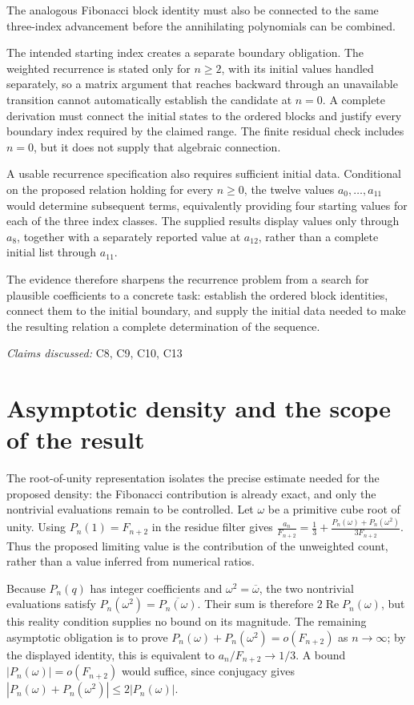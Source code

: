 \documentclass[11pt]{article}
\begin{document}
The analogous Fibonacci block identity must also be connected to the same three-index advancement before the annihilating polynomials can be combined.

The intended starting index creates a separate boundary obligation. The weighted recurrence is stated only for $n\geq2$, with its initial values handled separately, so a matrix argument that reaches backward through an unavailable transition cannot automatically establish the candidate at $n=0$. A complete derivation must connect the initial states to the ordered blocks and justify every boundary index required by the claimed range. The finite residual check includes $n=0$, but it does not supply that algebraic connection.

A usable recurrence specification also requires sufficient initial data. Conditional on the proposed relation holding for every $n\geq0$, the twelve values $a_0,\ldots,a_{11}$ would determine subsequent terms, equivalently providing four starting values for each of the three index classes. The supplied results display values only through $a_8$, together with a separately reported value at $a_{12}$, rather than a complete initial list through $a_{11}$.

The evidence therefore sharpens the recurrence problem from a search for plausible coefficients to a concrete task: establish the ordered block identities, connect them to the initial boundary, and supply the initial data needed to make the resulting relation a complete determination of the sequence.

\textit{Claims discussed: }C8, C9, C10, C13
\section{Asymptotic density and the scope of the result}
The root-of-unity representation isolates the precise estimate needed for the proposed density: the Fibonacci contribution is already exact, and only the nontrivial evaluations remain to be controlled. Let $\omega$ be a primitive cube root of unity. Using $P_n(1)=F_{n+2}$ in the residue filter gives $\frac{a_n}{F_{n+2}}=\frac13+\frac{P_n(\omega)+P_n(\omega^2)}{3F_{n+2}}$. Thus the proposed limiting value is the contribution of the unweighted count, rather than a value inferred from numerical ratios.

Because $P_n(q)$ has integer coefficients and $\omega^2=\overline{\omega}$, the two nontrivial evaluations satisfy $P_n(\omega^2)=\overline{P_n(\omega)}$. Their sum is therefore $2\operatorname{Re}P_n(\omega)$, but this reality condition supplies no bound on its magnitude. The remaining asymptotic obligation is to prove $P_n(\omega)+P_n(\omega^2)=o(F_{n+2})$ as $n\to\infty$; by the displayed identity, this is equivalent to $a_n/F_{n+2}\to1/3$. A bound $|P_n(\omega)|=o(F_{n+2})$ would suffice, since conjugacy gives $|P_n(\omega)+P_n(\omega^2)|\leq2|P_n(\omega)|$.
\end{document}
